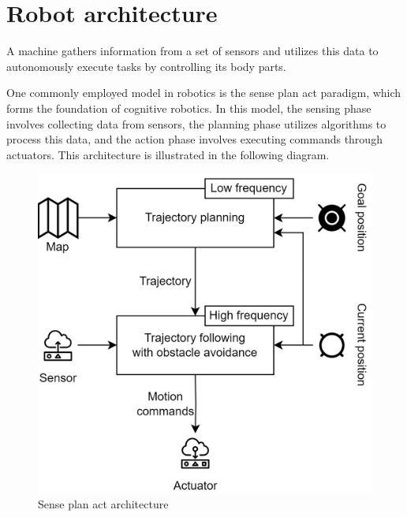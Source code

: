 \section{Robot architecture}

A machine gathers information from a set of sensors and utilizes this data to autonomously execute tasks by controlling its body parts.

One commonly employed model in robotics is the sense plan act paradigm, which forms the foundation of cognitive robotics.
In this model, the sensing phase involves collecting data from sensors, the planning phase utilizes algorithms to process this data, and the action phase involves executing commands through actuators.
This architecture is illustrated in the following diagram.

\begin{figure}[H]
    \centering
    \includegraphics[width=0.6\linewidth]{images/sap.png}
    \caption{Sense plan act architecture}
\end{figure}